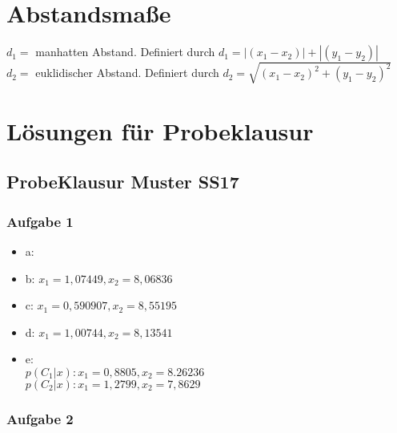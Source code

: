 \documentclass{article}
\begin{document}
\section{Abstandsmaße}
$d_1 =$ manhatten Abstand. Definiert durch $d_1 = |(x_1 - x_2)| + |(y_1 - y_2)|$
\\
$d_2 =$ euklidischer Abstand. Definiert durch $d_2=\sqrt{(x_1 - x_2)^2+(y_1 - y_2)^2}$
\\


\newpage
\section{Lösungen für Probeklausur}

\subsection{ProbeKlausur Muster SS17}

\subsubsection{Aufgabe 1}

\begin{itemize}
	\item a:
	\item b: $x_1 = 1,07449 , x_2 = 8,06836$
	\item c: $x_1 = 0,590907 , x_2 = 8,55195$
	\item d: $x_1 = 1,00744 , x_2 = 8,13541$
	\item e: \\$p(C_1 | x) : x_1 = 0,8805 , x_2 = 8.26236$ \\ 		$p(C_2| x) : x_1 = 1,2799 , x_2 = 7,8629$
\end{itemize}

\subsubsection{Aufgabe 2}
\end{document}
